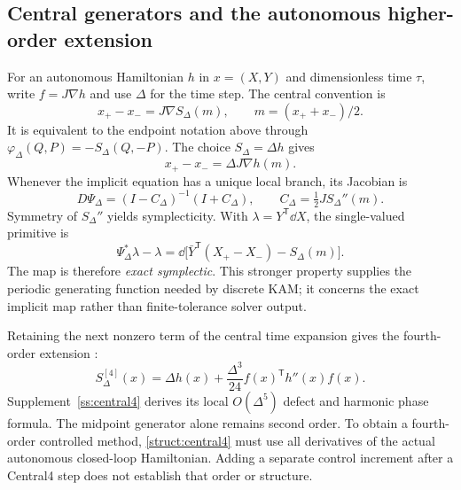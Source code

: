 \subsection{Central generators and the autonomous higher-order extension}
\label{struct:schemes}

For an autonomous Hamiltonian $h$ in $x=(X,Y)$ and dimensionless time $\tau$, write $f=J\nabla h$ and use $\Delta$ for the time step. The central convention is
\begin{equation}\label{struct:central-map}
 x_+-x_-=J\nabla S_\Delta(m),\qquad m=(x_++x_-)/2.
\end{equation}
It is equivalent to the endpoint notation above through $\varphi_\Delta(Q,P)=-S_\Delta(Q,-P)$. The choice $S_\Delta=\Delta h$ gives
\begin{equation}\label{struct:midpoint}
 x_+-x_-=\Delta J\nabla h(m).
\end{equation}
Whenever the implicit equation has a unique local branch, its Jacobian is
\begin{equation}\label{struct:cayley}
 D\Psi_\Delta=(I-C_\Delta)^{-1}(I+C_\Delta),\qquad
 C_\Delta=\tfrac12J S_\Delta''(m).
\end{equation}
Symmetry of $S_\Delta''$ yields symplecticity. With $\lambda=Y^{\mathsf T}\dd X$, the single-valued primitive is
\begin{equation}\label{struct:exact-symplectic}
 \Psi_\Delta^*\lambda-\lambda
 =\dd\bigl[\bar Y^{\mathsf T}(X_+-X_-)-S_\Delta(m)\bigr].
\end{equation}
The map is therefore \emph{exact symplectic}. This stronger property supplies the periodic generating function needed by discrete KAM; it concerns the exact implicit map rather than finite-tolerance solver output.

Retaining the next nonzero term of the central time expansion gives the fourth-order extension \citep{feng}:
\begin{equation}\label{struct:central4}
 S_\Delta^{[4]}(x)=\Delta h(x)
       +\frac{\Delta^3}{24}f(x)^{\mathsf T}h''(x)f(x).
\end{equation}
Supplement~\ref{ss:central4} derives its local $O(\Delta^5)$ defect and harmonic phase formula. The midpoint generator alone remains second order. To obtain a fourth-order controlled method, \eqref{struct:central4} must use all derivatives of the actual autonomous closed-loop Hamiltonian. Adding a separate control increment after a Central4 step does not establish that order or structure.

